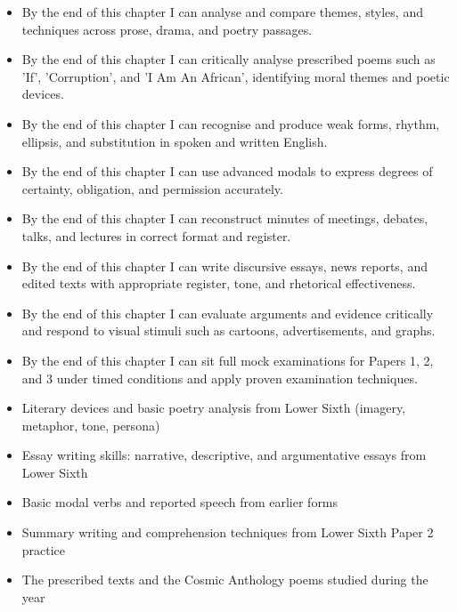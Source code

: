 \documentclass[11pt]{article}
\begin{document}
\begin{objectifs}
\begin{itemize}
\item By the end of this chapter I can analyse and compare themes, styles, and techniques across prose, drama, and poetry passages.
\item By the end of this chapter I can critically analyse prescribed poems such as 'If', 'Corruption', and 'I Am An African', identifying moral themes and poetic devices.
\item By the end of this chapter I can recognise and produce weak forms, rhythm, ellipsis, and substitution in spoken and written English.
\item By the end of this chapter I can use advanced modals to express degrees of certainty, obligation, and permission accurately.
\item By the end of this chapter I can reconstruct minutes of meetings, debates, talks, and lectures in correct format and register.
\item By the end of this chapter I can write discursive essays, news reports, and edited texts with appropriate register, tone, and rhetorical effectiveness.
\item By the end of this chapter I can evaluate arguments and evidence critically and respond to visual stimuli such as cartoons, advertisements, and graphs.
\item By the end of this chapter I can sit full mock examinations for Papers 1, 2, and 3 under timed conditions and apply proven examination techniques.
\end{itemize}
\end{objectifs}

\begin{prerequis}
\begin{itemize}
\item Literary devices and basic poetry analysis from Lower Sixth (imagery, metaphor, tone, persona)
\item Essay writing skills: narrative, descriptive, and argumentative essays from Lower Sixth
\item Basic modal verbs and reported speech from earlier forms
\item Summary writing and comprehension techniques from Lower Sixth Paper 2 practice
\item The prescribed texts and the Cosmic Anthology poems studied during the year
\end{itemize}
\end{prerequis}
\end{document}
